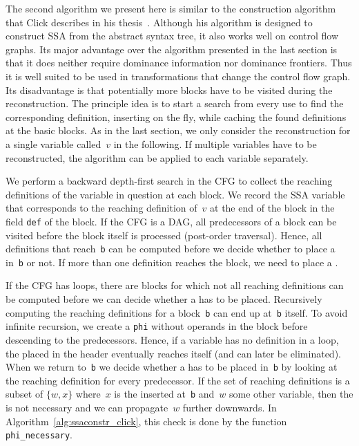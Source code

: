 The second algorithm we present here is similar to the construction algorithm that Click describes in his thesis~\cite{click:thesis}.
Although his algorithm is designed to construct SSA from the abstract syntax tree, it also works well on control flow graphs.
Its major advantage over the algorithm presented in the last section is that it does neither require dominance information nor dominance frontiers.
Thus it is well suited to be used in transformations that change the control flow graph.
Its disadvantage is that potentially more blocks have to be visited during the reconstruction.
The principle idea is to start a search from every use to find the corresponding definition, inserting \phifuns on the fly, while caching the found definitions at the basic blocks.
As in the last section, we only consider the reconstruction for a single variable called~$v$ in the following.
If multiple variables have to be reconstructed, the algorithm can be applied to each variable separately.

We perform a backward depth-first search in the CFG to collect the reaching definitions of the variable in question at each block.
We record the SSA variable that corresponds to the reaching definition of~$v$ at the end of the block in the field \verb|def| of the block.
If the CFG is a DAG, all predecessors of a block can be visited before the block itself is processed (post-order traversal).
Hence, all definitions that reach~\verb|b| can be computed before we decide whether to place a \phifun in~\verb|b| or not.
If more than one definition reaches the block, we need to place a \phifun.

If the CFG has loops, there are blocks for which not all reaching definitions can be computed before we can decide whether a \phifun has to be placed.
Recursively computing the reaching definitions for a block~\verb|b| can end up at~\verb|b| itself.
To avoid infinite recursion, we create a \phifun \verb|phi| without operands in the block before descending to the predecessors. 
Hence, if a variable has no definition in a loop, the \phifun placed in the header eventually reaches itself (and can later be eliminated). 
When we return to~\verb|b| we decide whether a \phifun has to be placed in~\verb|b| by looking at the reaching definition for every predecessor.
If the set of reaching definitions is a subset of $\{w,x\}$ where~$x$ is the \phifun inserted at~\verb|b| and~$w$ some other variable, then the \phifun is not necessary and we can propagate~$w$ further downwards.
In Algorithm~\ref{alg:ssaconstr_click}, this check is done by the function \verb|phi_necessary|.

